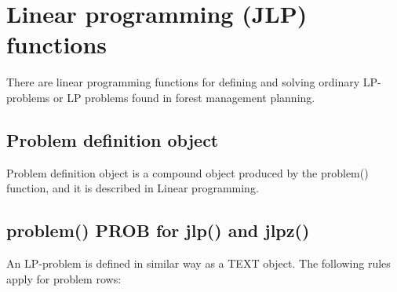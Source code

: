 \section{Linear programming (JLP) functions}
\label{jlpintro}
There are linear programming functions for defining and solving ordinary LP-problems or
LP problems found in forest management planning.
\subsection{Problem definition object}
\label{problemo}
Problem definition object is a compound object produced by the \textcolor{VioletRed}{problem}() function, and it is
described in Linear programming.
\subsection{\textcolor{VioletRed}{problem}() PROB for \textcolor{VioletRed}{jlp}() and \textcolor{VioletRed}{jlpz}()}
\label{problem}
An LP-problem is defined in similar way as a TEXT object.
The following rules apply for problem rows:
